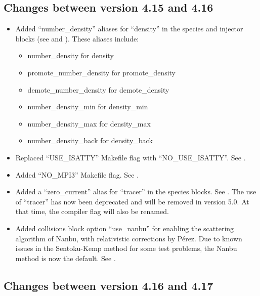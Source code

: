\subsection{Changes between version 4.15 and 4.16}

\begin{itemize}
\item Added ``number\_density'' aliases for ``density'' in the species and
   injector blocks (see  and ).
   These aliases include:
\begin{itemize}
\item number\_density for density
\item promote\_number\_density for promote\_density
\item demote\_number\_density for demote\_density
\item number\_density\_min for density\_min
\item number\_density\_max for density\_max
\item number\_density\_back for density\_back
\end{itemize}
\item Replaced ``USE\_ISATTY'' Makefile flag with ``NO\_USE\_ISATTY''.
  See .
\item Added ``NO\_MPI3'' Makefile flag. See .
\item Added a ``zero\_current'' alias for ``tracer'' in the species blocks.
  See . The use of ``tracer'' has now been deprecated and
  will be removed in version 5.0.
  At that time, the compiler flag will also be renamed.
\item Added collisions block option ``use\_nanbu'' for enabling the
   scattering algorithm of Nanbu, with relativistic corrections by
   P\'erez. Due to known issues in the Sentoku-Kemp
   method for some test problems, the Nanbu method is now the default.
   See .
\end{itemize}
\bigskip


\subsection{Changes between version 4.16 and 4.17}

